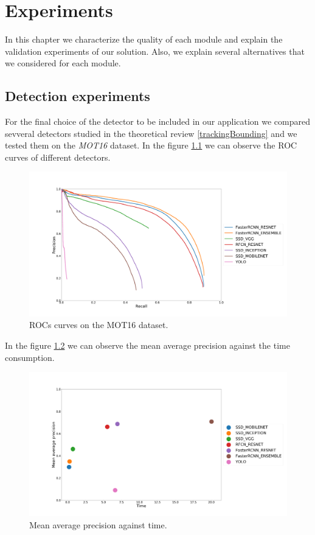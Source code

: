 \chapter{Experiments}\label{cap.experiments}


In this chapter we characterize the quality of each module and explain the validation experiments of our solution. Also, we explain several alternatives that we considered for each module.



\section{Detection experiments}\label{valdiation:det}


For the final choice of the detector to be included in our application we compared sevveral detectors studied in the theoretical review \ref{trackingBounding} and we tested them on the \textit{MOT16} dataset. In the figure \ref{experimDet1} we can observe the ROC curves of different detectors.



\begin{figure}[H]
\centering         
\includegraphics[width=0.9\linewidth]{evaluacionObject/dadas.png}
\caption{ROCs curves on the MOT16 dataset.} \label{experimDet1}
\end{figure}

In the figure \ref{experimDet2} we can observe the mean average precision against the time consumption.


\begin{figure}[H]
\centering         
\includegraphics[width=0.9\linewidth]{evaluacionObject/meanAverage2.png}
\caption{Mean average precision against time.} \label{experimDet2}
\end{figure}


